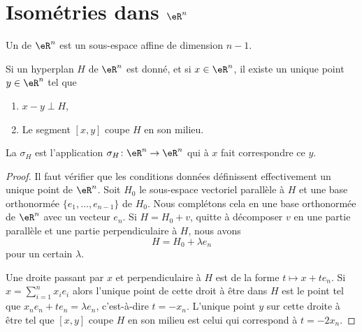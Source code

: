 
\section{Isométries dans $\eR^n$}

\begin{definition}
    Un  de \( \eR^n\) est un sous-espace affine de dimension \( n-1\).
\end{definition}

\begin{lemmaDef}
    Si un hyperplan \( H\) de \( \eR^n\) est donné, et si \( x\in \eR^n\), il existe un unique point \( y\in \eR^n\) tel que
    \begin{enumerate}
        \item
            \( x-y\perp H\),
        \item
            Le segment \( [x,y]\) coupe \( H\) en son milieu.
    \end{enumerate}
    La  \( \sigma_H\) est l'application $\sigma_H\colon \eR^n\to \eR^n $ qui à \( x\) fait correspondre ce \( y\).
\end{lemmaDef}

\begin{proof}
    Il faut vérifier que les conditions données définissent effectivement un unique point de \( \eR^n\). Soit \( H_0\) le sous-espace vectoriel parallèle à \( H\) et une base orthonormée \( \{ e_1,\ldots, e_{n-1} \}\) de \( H_0\). Nous complétons cela en une base orthonormée de \( \eR^n\) avec un vecteur \( e_n\). Si \( H=H_0+v\), quitte à décomposer \( v\) en une partie parallèle et une partie perpendiculaire à \( H\), nous avons
    \begin{equation}
        H=H_0+\lambda e_n
    \end{equation}
    pour un certain \( \lambda\).

    Une droite passant par \( x\) et perpendiculaire à \( H\) est de la forme \( t\mapsto x+te_n\). Si \( x=\sum_{i=1}^{n}x_ie_i\) alors l'unique point de cette droit à être dans \( H\) est le point tel que \(   x_ne_n+te_n=\lambda e_n   \), c'est-à-dire \( t=-x_n\). L'unique point \( y\) sur cette droite à être tel que \( [x,y ]\) coupe \( H\) en son milieu est celui qui correspond à \( t=-2x_n\).
\end{proof}

